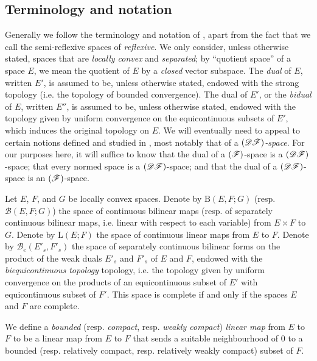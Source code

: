 \documentclass{article}
\theoremstyle{plain}
\newcommand{\BB}{\mathrm{B}}
\newcommand{\LL}{\mathrm{L}}
\newcommand{\sBB}{\mathscr{B}}
\newcommand{\DF}{\mbox{\normalfont($\mathscr{DF}$)}}
\newcommand{\FF}{\mbox{\normalfont($\mathscr{F}$)}}
\newcommand{\oldpage}[1]{\marginpar{\footnotesize$\Big\vert$ \textit{p.~#1}}}
\begin{document}
\subsection*{Terminology and notation}
\label{subsection:terminology-and-notation}
%

Generally we follow the terminology and notation of \cite{3}, apart from the fact that we call the semi-reflexive spaces of \cite{3} \emph{reflexive}.
We only consider, unless otherwise stated, spaces that are \emph{locally convex} and \emph{separated};
by ``quotient space'' of a space $E$, we mean the quotient of $E$ by a \emph{closed} vector subspace.
The \emph{dual} of $E$, written $E'$, is assumed to be, unless otherwise stated, endowed with the strong topology (i.e. the topology
\oldpage{75}
of bounded convergence).
The dual of $E'$, or the \emph{bidual} of $E$, written $E''$, is assumed to be, unless otherwise stated, endowed with the topology given by uniform convergence on the equicontinuous subsets of $E'$, which induces the original topology on $E$.
We will eventually need to appeal to certain notions defined and studied in \cite{6}, most notably that of a \emph{$\DF$-space}.
For our purposes here, it will suffice to know that the dual of a $\FF$-space is a $\DF$-space; that every normed space is a $\DF$-space; and that the dual of a $\DF$-space is an $\FF$-space.

Let $E$, $F$, and $G$ be locally convex spaces.
Denote by $\BB(E,F;G)$ (resp. $\sBB(E,F;G)$) the space of continuous bilinear maps (resp. of separately continuous bilinear maps, i.e. linear with respect to each variable) from $E\times F$ to $G$.
Denote by $\LL(E;F)$ the space of continuous linear maps from $E$ to $F$.
Denote by $\sBB_e(E'_s,F'_s)$ the space of separately continuous bilinear forms on the product of the weak duals $E'_s$ and $F'_s$ of $E$ and $F$, endowed with the \emph{biequicontinuous topology} topology, i.e. the topology given by uniform convergence on the products of an equicontinuous subset of $E'$ with equicontinuous subset of $F'$.
This space is complete if and only if the spaces $E$ and $F$ are complete.

We define a \emph{bounded} (resp. \emph{compact}, resp. \emph{weakly compact}) \emph{linear map} from $E$ to $F$ to be a linear map from $E$ to $F$ that sends a suitable neighbourhood of $0$ to a bounded (resp. relatively compact, resp. relatively weakly compact) subset of $F$.
\end{document}
